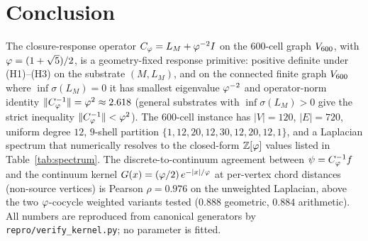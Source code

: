\section{Conclusion}\label{sec:conclusion}

The closure-response operator $C_{\varphi} = L_M + \varphi^{-2} I$ on the
600-cell graph $V_{600}$, with $\varphi = (1+\sqrt{5})/2$, is a
geometry-fixed response primitive: positive definite under
(H1)--(H3) on the substrate $(M, L_M)$, and on the connected
finite graph $V_{600}$ where $\inf \sigma(L_M) = 0$ it has
smallest eigenvalue $\varphi^{-2}$ and operator-norm identity
$\|C_{\varphi}^{-1}\| = \varphi^{2} \approx 2.618$ (general substrates with
$\inf \sigma(L_M) > 0$ give the strict inequality
$\|C_{\varphi}^{-1}\| < \varphi^{2}$).
The 600-cell instance has $|V|=120$, $|E|=720$, uniform degree
$12$, $9$-shell partition $\{1,12,20,12,30,12,20,12,1\}$, and a
Laplacian spectrum that numerically resolves to the closed-form
$\mathbb{Z}[\varphi]$ values listed in Table~\ref{tab:spectrum}. The
discrete-to-continuum agreement between $\psi = C_{\varphi}^{-1} f$ and
the continuum kernel $G(x) = (\varphi/2)\,e^{-|x|/\varphi}$ at per-vertex
chord distances (non-source vertices) is Pearson $\rho = 0.976$ on
the unweighted Laplacian, above the two $\varphi$-cocycle weighted
variants tested ($0.888$ geometric, $0.884$ arithmetic). All numbers are reproduced from canonical
generators by \texttt{repro/verify\_kernel.py}; no parameter is
fitted.

